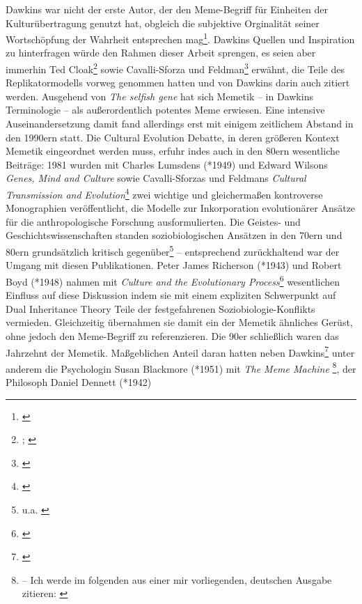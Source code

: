 \documentclass[openany,twoside,twocolumn]{book}
\let\rmarkdownfootnote\footnote%
\def\footnote{\protect\rmarkdownfootnote}
\begin{document}
Dawkins war nicht der erste Autor, der den Meme-Begriff für Einheiten
der Kulturübertragung genutzt hat, obgleich die subjektive Orginalität
seiner Wortschöpfung der Wahrheit entsprechen mag\footnote{\textcite{laurent_note_1999}}.
Dawkins Quellen und Inspiration zu hinterfragen würde den Rahmen dieser
Arbeit sprengen, es seien aber immerhin Ted Cloak\footnote{\textcite{cloak_cultural_1966};
  \textcite{cloak_is_1975}} sowie Cavalli-Sforza und Feldman\footnote{\textcite{cavalli-sforza_models_1973}}
erwähnt, die Teile des Replikatormodells vorweg genommen hatten und von
Dawkins darin auch zitiert werden. Ausgehend von \emph{The selfish gene}
hat sich Memetik -- in Dawkins Terminologie -- als außerordentlich
potentes Meme erwiesen. Eine intensive Auseinandersetzung damit fand
allerdings erst mit einigem zeitlichem Abstand in den 1990ern statt. Die
Cultural Evolution Debatte, in deren größeren Kontext Memetik
eingeordnet werden muss, erfuhr indes auch in den 80ern wesentliche
Beiträge: 1981 wurden mit Charles Lumsdens (*1949) und Edward Wilsons
\emph{Genes, Mind and Culture} \autocite[ -- Lumsden und Wilson führen
mit \emph{Culturgen} eine dem Meme ähnliche Beobachtungseinheit
ein.]{lumsden_genes_1981} sowie Cavalli-Sforzas und Feldmans
\emph{Cultural Transmission and Evolution}\footnote{\textcite{cavalli-sforza_cultural_1981}}
zwei wichtige und gleichermaßen kontroverse Monographien veröffentlicht,
die Modelle zur Inkorporation evolutionärer Ansätze für die
anthropologische Forschung ausformulierten. Die Geistes- und
Geschichtswissenschaften standen soziobiologischen Ansätzen in den 70ern
und 80ern grundsätzlich kritisch gegenüber\footnote{u.a.
  \textcite{sahlins_use_1976}} -- entsprechend zurückhaltend war der
Umgang mit diesen Publikationen. Peter James Richerson (*1943) und
Robert Boyd (*1948) nahmen mit \emph{Culture and the Evolutionary
Process}\footnote{\textcite{boyd_culture_1985}} wesentlichen Einfluss
auf diese Diskussion indem sie mit einem expliziten Schwerpunkt auf Dual
Inheritance Theory Teile der festgefahrenen Soziobiologie-Konflikts
vermieden. Gleichzeitig übernahmen sie damit ein der Memetik ähnliches
Gerüst, ohne jedoch den Meme-Begriff zu referenzieren. Die 90er
schließlich waren das Jahrzehnt der Memetik. Maßgeblichen Anteil daran
hatten neben Dawkins\footnote{\textcite{dawkins_viruses_1993}} unter
anderem die Psychologin Susan Blackmore (*1951) mit \emph{The Meme
Machine} \footnote{\textcite{blackmore_meme_1999} -- Ich werde im
  folgenden aus einer mir vorliegenden, deutschen Ausgabe zitieren:
  \textcite{blackmore_macht_2000}}, der Philosoph Daniel Dennett (*1942)
\end{document}
